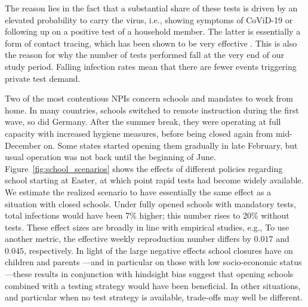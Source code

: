The reason lies in the fact that a substantial share of these tests is driven by an
elevated probability to carry the virus, i.e., showing symptoms of CoViD-19 or following
up on a positive test of a household member. The latter is essentially a form of contact
tracing, which has been shown to be very effective \citep{Contreras2021,
Kretzschmar2020}. This is also the reason for why the number of tests performed fall at
the very end of our study period. Falling infection rates mean that there are fewer
events triggering private test demand.

Two of the most contentious NPIs concern schools and mandates to work from home. In many
countries, schools switched to remote instruction during the first wave, so did Germany.
After the summer break, they were operating at full capacity with increased hygiene
measures, before being closed again from mid-December on. Some states started opening
them gradually in late February, but usual operation was not back until the beginning of
June. Figure~\ref{fig:school_scenarios} shows the effects of different policies regarding
school starting at Easter, at which point rapid tests had become widely available. We
estimate the realized scenario to have essentially the same effect as a situation with
closed schools. Under fully opened schools with mandatory tests, total infections would
have been 7\% higher; this number rises to 20\% without tests. These effect sizes are
broadly in line with empirical studies, e.g., \citet{Vlachos2021} To use another metric, the effective weekly
reproduction number differs by $0.017$ and $0.045$, respectively. In light of the large
negative effects school closures have on children and parents \citep{Luijten2021,
Melegari2021} ---and in particular on those with low socio-economic status---these results in
conjunction with hindsight bias suggest that opening schools combined with a testing
strategy would have been beneficial. In other situations, and particular when no test
strategy is available, trade-offs may well be different.

